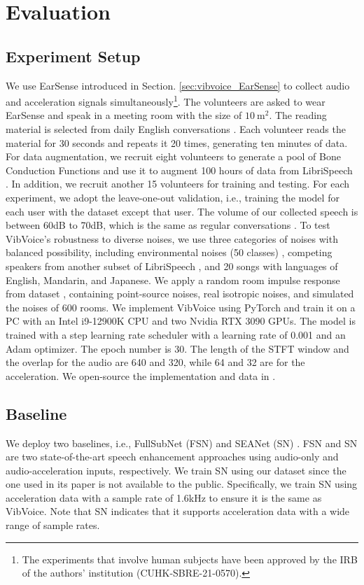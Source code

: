 \section{Evaluation} \label{sec:vibvoice_evaluation}

\subsection{Experiment Setup} \label{sec:vibvoice_experiment}
We use EarSense introduced in Section. \ref{sec:vibvoice_EarSense} to collect audio and acceleration signals simultaneously\footnote{The experiments that involve human subjects have been approved by the IRB of the authors' institution (CUHK-SBRE-21-0570).}. The volunteers are asked to wear EarSense and speak in a meeting room with the size of $10~\text{m}^2$. The reading material is selected from daily English conversations \citep{Everyday75:online}. Each volunteer reads the material for 30 seconds and repeats it 20 times, generating ten minutes of data. For data augmentation, we recruit eight volunteers to generate a pool of Bone Conduction Functions and use it to augment 100 hours of data from LibriSpeech \citep{panayotov2015librispeech}. 
In addition, we recruit another 15 volunteers for training and testing. For each experiment, we adopt the leave-one-out validation, i.e., training the model for each user with the dataset except that user. The volume of our collected speech is between 60dB to 70dB, which is the same as regular conversations \citep{WhatNois20:online}.
To test VibVoice's robustness to diverse noises, we use three categories of noises with balanced possibility, including environmental noises (50 classes) \citep{piczak2015dataset}, competing speakers from another subset of LibriSpeech \citep{panayotov2015librispeech}, and 20 songs with languages of English, Mandarin, and Japanese. We apply a random room impulse response from dataset \citep{ko2017study}, containing point-source noises, real isotropic noises, and simulated the noises of 600 rooms.
We implement VibVoice using PyTorch and train it on a PC with an Intel i9-12900K CPU and two Nvidia RTX 3090 GPUs. 
The model is trained with a step learning rate scheduler with a learning rate of 0.001 and an Adam optimizer. The epoch number is 30.
The length of the STFT window and the overlap for the audio are 640 and 320, while 64 and 32 are for the acceleration. We open-source the implementation and data in \citep{dataset}.

\subsection{Baseline}
We deploy two baselines, i.e., FullSubNet (FSN) \citep{hao2021fullsubnet} and SEANet (SN) \citep{tagliasacchi2020seanet}.
FSN and SN are two state-of-the-art speech enhancement approaches using audio-only and audio-acceleration inputs, respectively.
We train SN using our dataset since the one used in its paper is not available to the public. Specifically, we train SN using acceleration data with a sample rate of 1.6kHz to ensure it is the same as VibVoice. Note that SN indicates that it supports acceleration data with a wide range of sample rates.


